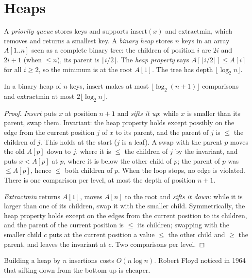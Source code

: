 \section{Heaps}\label{sec:heaps}

A \emph{priority queue} stores keys and supports $\mathrm{insert}(x)$ and $\mathrm{extractmin}$, which removes and returns a smallest key. A \emph{binary heap}
stores $n$ keys in an array $A[1..n]$ seen as a complete binary tree: the children of position $i$ are $2i$ and $2i+1$ (when $\le n$), its parent
is $\lfloor i/2\rfloor$. The \emph{heap property} says $A[\lfloor i/2\rfloor]\le A[i]$ for all $i\ge2$, so the minimum is at the root $A[1]$. The tree has
depth $\lfloor\log_2n\rfloor$.

\begin{proposition}\label{prop:heapops}
In a binary heap of $n$ keys, $\mathrm{insert}$ makes at most $\lfloor\log_2(n+1)\rfloor$ comparisons and $\mathrm{extractmin}$ at most $2\lfloor\log_2n\rfloor$.
\end{proposition}
\begin{proof}
\emph{Insert} puts $x$ at position $n+1$ and \emph{sifts it up}: while $x$ is smaller than its parent, swap them. Invariant: the heap property holds except
possibly on the edge from the current position $j$ of $x$ to its parent, and the parent of $j$ is $\le$ the children of $j$. This holds at the start
($j$ is a leaf). A swap with the parent $p$ moves the old $A[p]$ down to $j$, where it is $\le$ the children of $j$ by the invariant, and puts $x<A[p]$
at $p$, where it is below the other child of $p$; the parent of $p$ was $\le A[p]$, hence $\le$ both children of $p$. When the loop stops, no edge is violated.
There is one comparison per level, at most the depth of position $n+1$.

\emph{Extractmin} returns $A[1]$, moves $A[n]$ to the root and \emph{sifts it down}: while it is larger than one of its children, swap it with the smaller
child. Symmetrically, the heap property holds except on the edges from the current position to its children, and the parent of the current position
is $\le$ its children; swapping with the smaller child $c$ puts at the current position a value $\le$ the other child and $\ge$ the parent, and leaves the
invariant at $c$. Two comparisons per level.
\end{proof}

Building a heap by $n$ insertions costs $O(n\log n)$. Robert Floyd noticed in 1964 that sifting down from the bottom up is cheaper.

